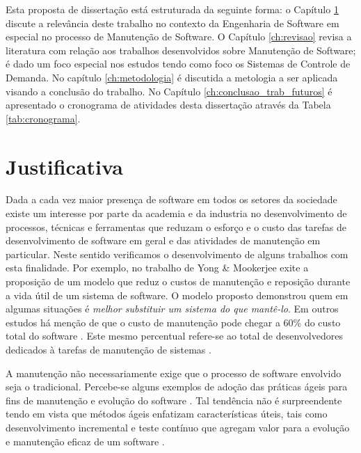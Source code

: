 \documentclass[msc,proposal,hidelot,hideabstract]{ppgccufmg} %
\begin{document}
Esta proposta de dissertação está estruturada da seguinte forma: o  Capítulo
\ref{ch:justificativa} discute a relevância deste trabalho no contexto da Engenharia de Software em especial no processo de Manutenção de
Software. O Capítulo \ref{ch:revisao} revisa a literatura com relação aos
trabalhos desenvolvidos sobre Manutenção de Software; é dado um foco especial
nos estudos tendo como foco os Sistemas de Controle de Demanda. No
capítulo \ref{ch:metodologia} é discutida a metologia a ser aplicada visando a
conclusão do trabalho. No Capítulo \ref{ch:conclusao_trab_futuros} é apresentado o cronograma de
atividades desta dissertação através da Tabela \ref{tab:cronograma}.

\chapter{Justificativa}
\label{ch:justificativa}
Dada a cada vez maior presença de software em todos os setores da sociedade
existe um interesse por parte da academia e da industria no desenvolvimento de
processos, técnicas e ferramentas que reduzam o esforço e o custo das tarefas
de desenvolvimento de software em geral e das atividades de manutenção em
particular. Neste sentido verificamos o desenvolvimento de alguns trabalhos com
esta finalidade. Por exemplo, no trabalho de Yong \& Mookerjee \cite{1423995}  exite a proposição
de um modelo que reduz o custos de manutenção e reposição durante a vida útil de um sistema de software. O modelo
proposto demonstrou quem em algumas situações é \textit{melhor substituir um
  sistema do que mantê-lo}. Em outros estudos há menção de que o custo de
manutenção pode chegar a 60\% do custo total do software \cite{kaur2015review}. Este mesmo percentual
refere-se ao total de desenvolvedores dedicados à tarefas de manutenção de
sistemas \cite{Zhang_2003}.

A manutenção não necessariamente exige que o processo de software envolvido
seja o tradicional. Percebe-se alguns exemplos de adoção das práticas ágeis
para fins de manutenção e evolução do software \cite{kajko2009model}. Tal
tendência não é surpreendente tendo em vista que métodos ágeis enfatizam
características úteis, tais como desenvolvimento incremental e teste contínuo
que agregam valor para a evolução e manutenção eficaz de um software
\cite{thomas2006agile}.
\end{document}

